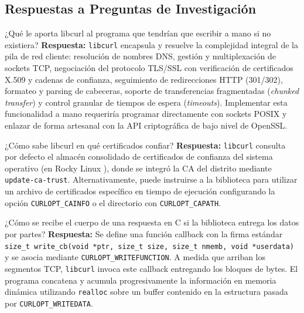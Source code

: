\documentclass[10pt,a4paper]{article}
\begin{document}
\subsection{Respuestas a Preguntas de Investigación}

\begin{pregunta}{¿Qué le aporta libcurl al programa que tendrían que escribir a mano si no existiera?}
    \textbf{Respuesta:} \texttt{libcurl} encapsula y resuelve la complejidad integral de la pila de red cliente: resolución de nombres DNS, gestión y multiplexación de sockets TCP, negociación del protocolo TLS/SSL con verificación de certificados X.509 y cadenas de confianza, seguimiento de redirecciones HTTP (301/302), formateo y parsing de cabeceras, soporte de transferencias fragmentadas (\textit{chunked transfer}) y control granular de tiempos de espera (\textit{timeouts}). Implementar esta funcionalidad a mano requeriría programar directamente con sockets POSIX y enlazar de forma artesanal con la API criptográfica de bajo nivel de OpenSSL.
\end{pregunta}

\begin{pregunta}{¿Cómo sabe libcurl en qué certificados confiar?}
    \textbf{Respuesta:} \texttt{libcurl} consulta por defecto el almacén consolidado de certificados de confianza del sistema operativo (en Rocky Linux ), donde se integró la CA del distrito mediante \texttt{update-ca-trust}. Alternativamente, puede instruirse a la biblioteca para utilizar un archivo de certificados específico en tiempo de ejecución configurando la opción \texttt{CURLOPT\_CAINFO} o el directorio con \texttt{CURLOPT\_CAPATH}.
\end{pregunta}

\begin{pregunta}{¿Cómo se recibe el cuerpo de una respuesta en C si la biblioteca entrega los datos por partes?}
    \textbf{Respuesta:} Se define una función callback con la firma estándar \texttt{size\_t write\_cb(void *ptr, size\_t size, size\_t nmemb, void *userdata)} y se asocia mediante \texttt{CURLOPT\_WRITEFUNCTION}. A medida que arriban los segmentos TCP, \texttt{libcurl} invoca este callback entregando los bloques de bytes. El programa concatena y acumula progresivamente la información en memoria dinámica utilizando \texttt{realloc} sobre un buffer contenido en la estructura pasada por \texttt{CURLOPT\_WRITEDATA}.
\end{pregunta}
\end{document}
